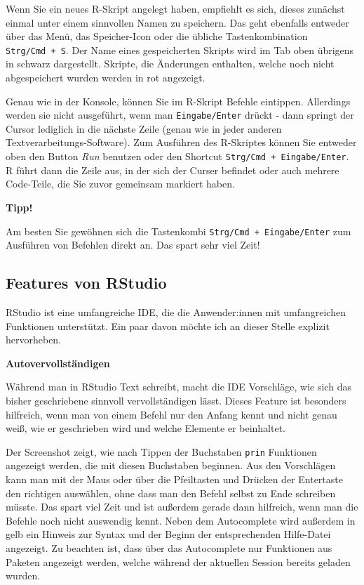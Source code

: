 \documentclass[
]{book}
\begin{document}
Wenn Sie ein neues R-Skript angelegt haben, empfiehlt es sich, dieses zunächst einmal unter einem sinnvollen Namen zu speichern. Das geht ebenfalls entweder über das Menü, das Speicher-Icon oder die übliche Tastenkombination \texttt{Strg/Cmd\ +\ S}. Der Name eines gespeicherten Skripts wird im Tab oben übrigens in schwarz dargestellt. Skripte, die Änderungen enthalten, welche noch nicht abgespeichert wurden werden in rot angezeigt.

Genau wie in der Konsole, können Sie im R-Skript Befehle eintippen. Allerdings werden sie nicht ausgeführt, wenn man \texttt{Eingabe/Enter} drückt - dann springt der Cursor lediglich in die nächste Zeile (genau wie in jeder anderen Textverarbeitungs-Software). Zum Ausführen des R-Skriptes können Sie entweder oben den Button \emph{Run} benutzen oder den Shortcut \texttt{Strg/Cmd\ +\ Eingabe/Enter}. R führt dann die Zeile aus, in der sich der Curser befindet oder auch mehrere Code-Teile, die Sie zuvor gemeinsam markiert haben.

\textbf{Tipp!}

Am besten Sie gewöhnen sich die Tastenkombi \texttt{Strg/Cmd\ +\ Eingabe/Enter} zum Ausführen von Befehlen direkt an. Das spart sehr viel Zeit!

\hypertarget{features-von-rstudio}{%
\subsection{Features von RStudio}\label{features-von-rstudio}}

RStudio ist eine umfangreiche IDE, die die Anwender:innen mit umfangreichen Funktionen unterstützt. Ein paar davon möchte ich an dieser Stelle explizit hervorheben.

\textbf{Autovervollständigen}

Während man in RStudio Text schreibt, macht die IDE Vorschläge, wie sich das bisher geschriebene sinnvoll vervollständigen lässt. Dieses Feature ist besonders hilfreich, wenn man von einem Befehl nur den Anfang kennt und nicht genau weiß, wie er geschrieben wird und welche Elemente er beinhaltet.

Der Screenshot zeigt, wie nach Tippen der Buchstaben \texttt{prin} Funktionen angezeigt werden, die mit diesen Buchstaben beginnen. Aus den Vorschlägen kann man mit der Maus oder über die Pfeiltasten und Drücken der Entertaste den richtigen auswählen, ohne dass man den Befehl selbst zu Ende schreiben müsste. Das spart viel Zeit und ist außerdem gerade dann hilfreich, wenn man die Befehle noch nicht auswendig kennt. Neben dem Autocomplete wird außerdem in gelb ein Hinweis zur Syntax und der Beginn der entsprechenden Hilfe-Datei angezeigt. Zu beachten ist, dass über das Autocomplete nur Funktionen aus Paketen angezeigt werden, welche während der aktuellen Session bereits geladen wurden.
\end{document}
